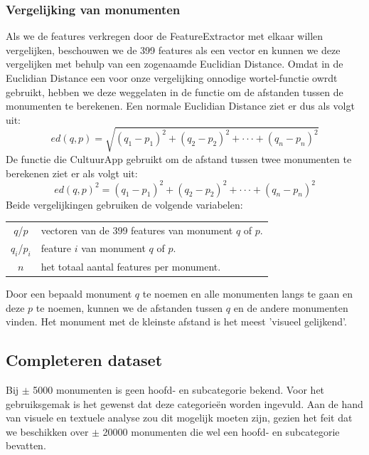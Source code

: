 \documentclass[a4paper,10pt]{article}
\begin{document}
		\subsubsection{Vergelijking van monumenten}
		Als we de features verkregen door de FeatureExtractor met elkaar willen vergelijken, beschouwen we de 399 features als een vector en kunnen we deze vergelijken met behulp van een zogenaamde Euclidian Distance. Omdat in de Euclidian Distance een voor onze vergelijking onnodige wortel-functie owrdt gebruikt, hebben we deze weggelaten in de functie om de afstanden tussen de monumenten te berekenen. Een normale Euclidian Distance ziet er dus als volgt uit:
		\begin{equation}
			ed(q, p) = \sqrt{(q_1 - p_1)^2 + (q_2 - p_2)^2 + \cdot\cdot\cdot + (q_n - p_n)^2}
		\end{equation}
		De functie die CultuurApp gebruikt om de afstand tussen twee monumenten te berekenen ziet er als volgt uit:
		\begin{equation}
			ed(q, p)^2 = (q_1 - p_1)^2 + (q_2 - p_2)^2 + \cdot\cdot\cdot + (q_n - p_n)^2
		\end{equation}
		Beide vergelijkingen gebruiken de volgende variabelen:
		\begin{center}
			\begin{tabular}{ c | l }
				$q$/$p$ & vectoren van de 399 features van monument $q$ of $p$.\\
				$q_{i}$/$p_{i}$ & feature $i$ van monument $q$ of $p$.\\
				$n$ & het totaal aantal features per monument.
			\end{tabular}
		\end{center}
		
		Door een bepaald monument $q$ te noemen en alle monumenten langs te gaan en deze $p$ te noemen, kunnen we de afstanden tussen $q$ en de andere monumenten vinden. Het monument met de kleinste afstand is het meest 'visueel gelijkend'.
		
	\subsection{Completeren dataset}
	Bij $\pm$ 5000 monumenten is geen hoofd- en subcategorie bekend. Voor het gebruiksgemak is het gewenst dat deze categorie\"en worden ingevuld. Aan de hand van visuele en textuele analyse zou dit mogelijk moeten zijn, gezien het feit dat we beschikken over $\pm$ 20000 monumenten die wel een hoofd- en subcategorie bevatten.
	
\end{document}
